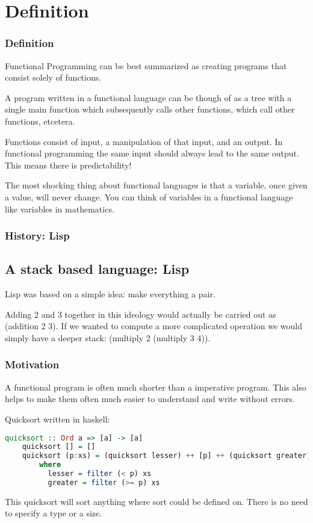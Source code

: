 \documentclass[presentation.tex]{subfiles}
\begin{document}
\section{Definition}
\begin{frame}
  \frametitle{Definition}
  Functional Programming can be best summarized as creating programs that consist solely of functions.
  
  \vspace{\baselineskip}
  A program written in a functional language can be though of as a tree with a single main function which subsequently calls other functions, which call other functions, etcetera.
  
  \vspace{\baselineskip}
  Functions consist of input, a manipulation of that input, and an output. In functional programming the same input should always lead to the same output. This means there is predictability!
  
  \vspace{\baselineskip}
  The most shocking thing about functional languages is that a variable, once given a value, will never change. You can think of variables in a functional language like variables in mathematics. %
  
\end{frame}


\begin{frame}
  \frametitle{History: Lisp}
  \subsection{A stack based language: Lisp}
  Lisp was based on a simple idea: make everything a pair.
  
  \vspace{\baselineskip}
  Adding 2 and 3 together in this ideology would actually be carried out as (addition 2 3). If we wanted to compute a more complicated operation we would simply have a deeper stack: (multiply 2 (multiply 3 4)).  
\end{frame}

\begin{frame}[fragile]
  \frametitle{Motivation}
  A functional program is often much shorter than a imperative program. This also helps to make them often much easier to understand and write without errors.

  \vspace{\baselineskip}
  Quicksort written in haskell:

  \begin{lstlisting}[language=Haskell]
    quicksort :: Ord a => [a] -> [a]
    quicksort [] = []
    quicksort (p:xs) = (quicksort lesser) ++ [p] ++ (quicksort greater)
        where
          lesser = filter (< p) xs
          greater = filter (>= p) xs
  \end{lstlisting}

  \vspace{\baselineskip}
  This quicksort will sort anything where sort could be defined on. There is no need to specify a type or a size.
\end{frame}
\end{document}
